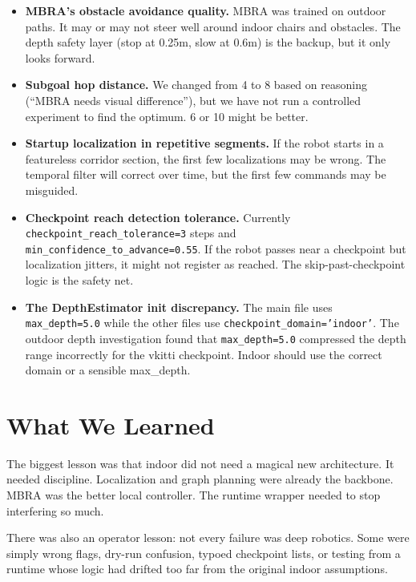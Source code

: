 \documentclass[11pt]{article}
\begin{document}
\begin{itemize}
\item \textbf{MBRA's obstacle avoidance quality.} MBRA was trained on outdoor paths. It may or may not steer well around indoor chairs and obstacles. The depth safety layer (stop at 0.25m, slow at 0.6m) is the backup, but it only looks forward.

\item \textbf{Subgoal hop distance.} We changed from 4 to 8 based on reasoning (``MBRA needs visual difference''), but we have not run a controlled experiment to find the optimum. 6 or 10 might be better.

\item \textbf{Startup localization in repetitive segments.} If the robot starts in a featureless corridor section, the first few localizations may be wrong. The temporal filter will correct over time, but the first few commands may be misguided.

\item \textbf{Checkpoint reach detection tolerance.} Currently \texttt{checkpoint\_reach\_tolerance=3} steps and \texttt{min\_confidence\_to\_advance=0.55}. If the robot passes near a checkpoint but localization jitters, it might not register as reached. The skip-past-checkpoint logic is the safety net.

\item \textbf{The DepthEstimator init discrepancy.} The main file uses \texttt{max\_depth=5.0} while the other files use \texttt{checkpoint\_domain='indoor'}. The outdoor depth investigation found that \texttt{max\_depth=5.0} compressed the depth range incorrectly for the vkitti checkpoint. Indoor should use the correct domain or a sensible max\_depth.
\end{itemize}


\section{What We Learned}

The biggest lesson was that indoor did not need a magical new architecture. It needed discipline. Localization and graph planning were already the backbone. MBRA was the better local controller. The runtime wrapper needed to stop interfering so much.

There was also an operator lesson: not every failure was deep robotics. Some were simply wrong flags, dry-run confusion, typoed checkpoint lists, or testing from a runtime whose logic had drifted too far from the original indoor assumptions.
\end{document}

